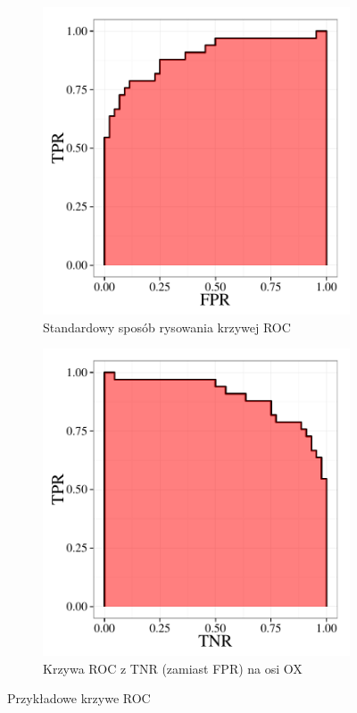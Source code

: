 \documentclass{mini}
\begin{document}
\begin{figure}[h]
  \begin{subfigure}[b]{0.4\textwidth}
    \includegraphics[width=\textwidth]{graphics/roc1.pdf}
    \caption{Standardowy sposób rysowania krzywej ROC}
    \label{fig:f1}
  \end{subfigure}
  \hfill
  \begin{subfigure}[b]{0.4\textwidth}
    \includegraphics[width=\textwidth]{graphics/roc2.pdf}
    \caption{Krzywa ROC z TNR (zamiast FPR) na osi OX}
    \label{fig:f2}
  \end{subfigure}
  \caption{Przykładowe krzywe ROC}
  \label{krzyweroc}
\end{figure}
\end{document}
